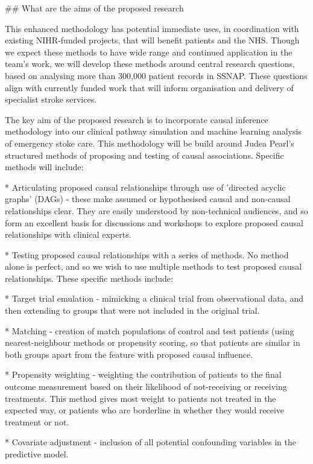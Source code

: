 \begin{markdown}
## What are the aims of the proposed research

This enhanced methodology has potential immediate uses, in coordination with existing NIHR-funded projects, that will benefit patients and the NHS. Though we expect these methods to have wide range and continued application in the team's work, we will develop these methods around central research questions, based on analysing more than 300,000 patient records in SSNAP. These questions align with currently funded work that will inform organisation and delivery of specialist stroke services.

The key aim of the proposed research is to incorporate causal inference methodology into our clinical pathway simulation and machine learning analysis of emergency stoke care. This methodology will be build around Judea Pearl's structured methods of proposing and testing of causal associations. Specific methods will include:

* Articulating proposed causal relationships through use of 'directed acyclic graphs' (DAGs) - these make assumed or hypothesised causal and non-causal relationships clear. They are easily understood by non-technical audiences, and so form an excellent basis for discussions and workshops to explore proposed causal relationships with clinical experts.

* Testing proposed causal relationships with a series of methods. No method alone is perfect, and so we wish to use multiple methods to test proposed causal relationships. These specific methods include:
    
    * Target trial emulation - mimicking a clinical trial from observational data, and then extending to groups that were not included in the original trial.
    
    * Matching - creation of match populations of control and test patients (using nearest-neighbour methods or propensity scoring, so that patients are similar in both groups apart from the feature with proposed causal influence.
    
    * Propensity weighting - weighting the contribution of patients to the final outcome measurement based on their likelihood of not-receiving or receiving treatments. This method gives most weight to patients not treated in the expected way, or patients who are borderline in whether they would receive treatment or not.
    
    * Covariate adjustment - inclusion of all potential confounding variables in the predictive model.
    

\end{markdown}
